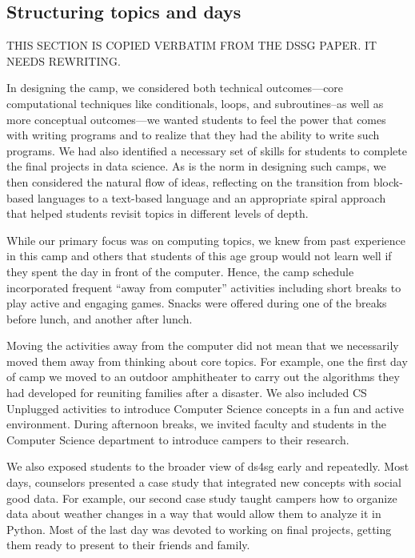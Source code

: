 \subsection{Structuring topics and days}

THIS SECTION IS COPIED VERBATIM FROM THE DSSG PAPER.  IT NEEDS
REWRITING.

In designing the camp, we considered both technical outcomes---core
computational techniques like conditionals, loops, and subroutines--as
well as more conceptual outcomes---we wanted students to feel the
power that comes with writing programs and to realize that they had
the ability to write such programs.  We had also identified a
necessary set of skills for students to complete the final projects
in data science.  As is the norm in designing such camps, we then
considered the natural flow of ideas, reflecting on the transition
from block-based languages to a text-based language and an appropriate
spiral approach that helped students revisit topics in different
levels of depth.

While our primary focus was on computing topics, we knew from past
experience in this camp and others that students of this age group
would not learn well if they spent the day in front of the computer.
Hence, the camp schedule incorporated frequent ``away from computer''
activities including short breaks to play active and engaging games.
Snacks were offered during one of the breaks before lunch, and
another after lunch.

Moving the activities away from the computer did not mean that we
necessarily moved them away from thinking about core topics.  For
example, one the first day of camp we moved to an outdoor amphitheater
to carry out the algorithms they had developed for reuniting families
after a disaster.  We also included CS Unplugged \cite{csunplugged}
activities to introduce Computer Science concepts in a fun and
active environment.  During afternoon breaks, we invited faculty
and students in the Computer Science department to introduce campers
to their research.  

We also exposed students to the broader view of ds4sg early and
repeatedly.  Most days, counselors presented a case study that
integrated new concepts with social good data. For example, our
second case study taught campers how to organize data about weather
changes in a way that would allow them to analyze it in Python.
Most of the last day was devoted to working on final projects,
getting them ready to present to their friends and family.

